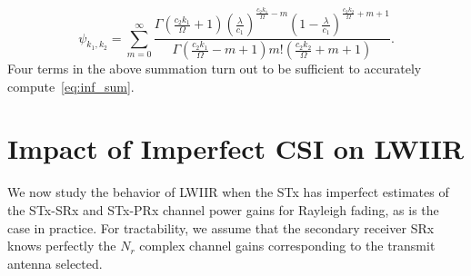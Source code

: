 \documentclass[12pt,draftcls,peerreview,onecolumn]{IEEEtran}
\newcommand{\lam}{\lambda}
\newcommand{\Nr}{{N_r}}
\newcommand{\cone}{c_{1}}
\newcommand{\ctwo}{c_{2}}
\newcommand{\lambym}{\frac{\lam}{\cone}}
\newcommand{\al}{\ctwo}
\newcommand{\snr}{\Omega}
\newcommand{\albysnr}[1][]{\frac{\al#1}{\snr}}
\newcommand{\psifun}[2]{\psi_{{#1},{#2}}}
\newcommand{\akone}{\albysnr[k_1]}
\newcommand{\midx}{m}
\begin{document}
%
\begin{equation}
\psifun{k_1}{k_2} = \sum_{\midx=0}^{\infty} \frac{\Gamma\left(\akone+1 \right) \left(\lambym\right)^{\albysnr[k_1]  - \midx} \left(1-\lambym\right)^{\albysnr[k_2]+\midx+1}}{\Gamma\left(\akone-\midx+1 \right)\midx ! \left(\albysnr[k_2]+\midx+1\right)}. 
\label{eq:inf_sum}
\end{equation}
Four terms in the above summation turn out to be sufficient to accurately compute~\eqref{eq:inf_sum}.  
%
%


\section{Impact of Imperfect CSI on LWIIR}
\label{sec:imperfectcsi}
We now study the behavior of LWIIR when the STx has imperfect estimates of the STx-SRx and STx-PRx channel power gains for Rayleigh fading, as is the case in practice. For tractability, we assume that the secondary receiver SRx knows perfectly the $\Nr$ complex channel gains corresponding to the transmit antenna selected. %
\end{document}
